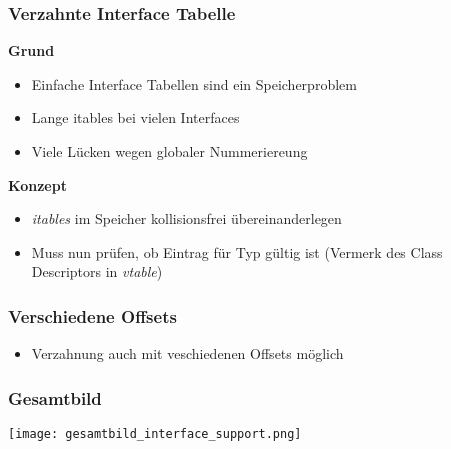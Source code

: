 \subsubsection{Verzahnte Interface Tabelle}
\textbf{Grund}
\begin{itemize}
    \item Einfache Interface Tabellen sind ein Speicherproblem
    \item Lange itables bei vielen Interfaces
    \item Viele Lücken wegen globaler Nummeriereung
\end{itemize}
\textbf{Konzept}
\begin{itemize}
    \item \textit{itables} im Speicher kollisionsfrei übereinanderlegen
    \item Muss nun prüfen, ob Eintrag für Typ gültig ist (Vermerk des Class Descriptors in \textit{vtable})
\end{itemize}
\subsubsection{Verschiedene Offsets}
\begin{itemize}
    \item Verzahnung auch mit veschiedenen Offsets möglich
\end{itemize}

\subsubsection{Gesamtbild}
\texttt{[image: gesamtbild\_interface\_support.png]}
